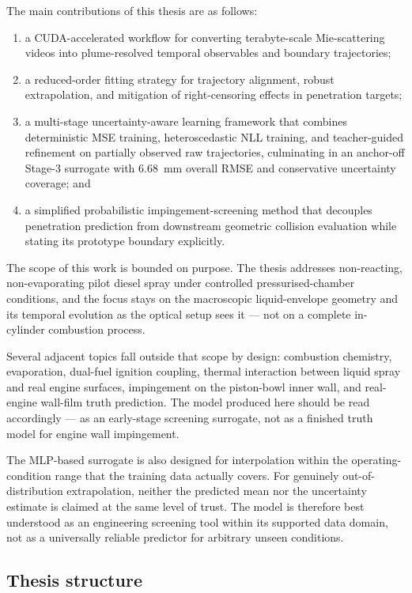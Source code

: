\documentclass[english, 12pt, a4paper, elec, utf8, a-2b, online]{aaltothesis}
\begin{document}
The main contributions of this thesis are as follows:
\begin{enumerate}
  \item a CUDA-accelerated workflow for converting terabyte-scale Mie-scattering videos into plume-resolved temporal observables and boundary trajectories;
  \item a reduced-order fitting strategy for trajectory alignment, robust extrapolation, and mitigation of right-censoring effects in penetration targets;
  \item a multi-stage uncertainty-aware learning framework that combines deterministic MSE training, heteroscedastic NLL training, and teacher-guided refinement on partially observed raw trajectories, culminating in an anchor-off Stage-3 surrogate with \SI{6.68}{mm} overall RMSE and conservative uncertainty coverage; and
  \item a simplified probabilistic impingement-screening method that decouples penetration prediction from downstream geometric collision evaluation while stating its prototype boundary explicitly.
\end{enumerate}

The scope of this work is bounded on purpose. 
The thesis addresses non-reacting, non-evaporating pilot diesel spray under controlled pressurised-chamber conditions, 
and the focus stays on the macroscopic liquid-envelope geometry and its temporal evolution as the optical setup sees it 
--- not on a complete in-cylinder combustion process.

Several adjacent topics fall outside that scope by design: combustion chemistry, evaporation, dual-fuel ignition coupling, 
thermal interaction between liquid spray and real engine surfaces, impingement on the piston-bowl inner wall, 
and real-engine wall-film truth prediction. The model produced here should be read accordingly 
--- as an early-stage screening surrogate, not as a finished truth model for engine wall impingement.

The MLP-based surrogate is also designed for interpolation within the operating-condition range that 
the training data actually covers. For genuinely out-of-distribution extrapolation, 
neither the predicted mean nor the uncertainty estimate is claimed at the same level of trust. 
The model is therefore best understood as an engineering screening tool within its supported data domain, 
not as a universally reliable predictor for arbitrary unseen conditions.

\subsection{Thesis structure}
\end{document}
